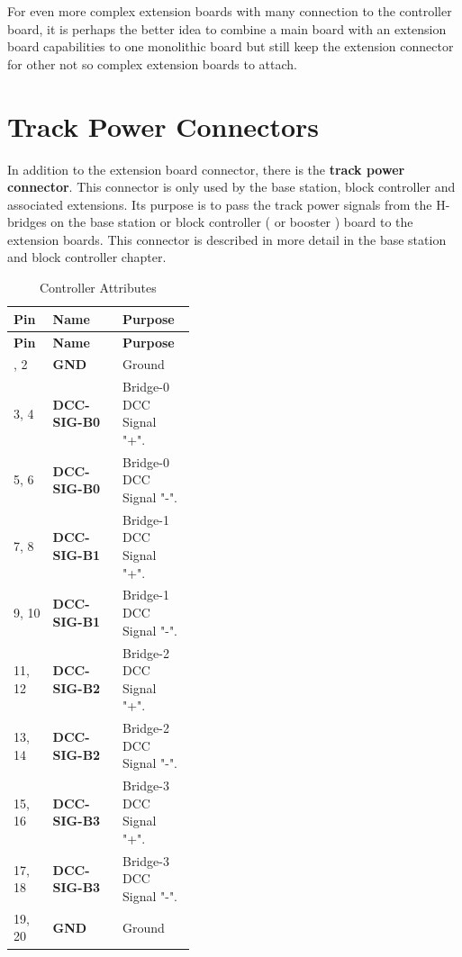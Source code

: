 For even more complex extension boards with many connection to the controller board, it is perhaps the better idea to combine a main board with an extension board capabilities to one monolithic board but still keep the extension connector for other not so complex extension boards to attach. 

\section{Track Power Connectors}

In addition to the extension board connector, there is the \textbf{track power connector}. This connector is only used by the base station, block controller and associated extensions. Its purpose is to pass the track power signals from the H-bridges on the base station or block controller ( or booster ) board to the extension boards. This connector is described in more detail in the base station and block controller chapter.

\begin{longtable}{@{}|l|l|p{0.4\linewidth}|@{}}
    \caption{Controller Attributes} \\
    \toprule
    \textbf{Pin} & \textbf{Name} & \textbf{Purpose} \\
    \midrule
    \endfirsthead
    \toprule
    \textbf{Pin} & \textbf{Name} & \textbf{Purpose} \\
    \midrule
    \endhead
    \midrule
    \endfoot
    \bottomrule
    \endlastfoot
    1, 2 & \textbf{GND} & Ground \\
    \midrule
    3, 4 & \textbf{DCC-SIG-B0} & Bridge-0 DCC Signal "+". \\
    \midrule
    5, 6 & \textbf{DCC-SIG-B0} & Bridge-0 DCC Signal "-". \\
    \midrule
    7, 8 & \textbf{DCC-SIG-B1} & Bridge-1 DCC Signal "+". \\
    \midrule
    9, 10 & \textbf{DCC-SIG-B1} & Bridge-1 DCC Signal "-". \\
    \midrule
    11, 12 & \textbf{DCC-SIG-B2} & Bridge-2 DCC Signal "+". \\
    \midrule
    13, 14 & \textbf{DCC-SIG-B2} & Bridge-2 DCC Signal "-". \\
    \midrule
    15, 16 & \textbf{DCC-SIG-B3} & Bridge-3 DCC Signal "+". \\
    \midrule
    17, 18 & \textbf{DCC-SIG-B3} & Bridge-3 DCC Signal "-". \\
    \midrule
    19, 20 & \textbf{GND} & Ground \\
\end{longtable}%

